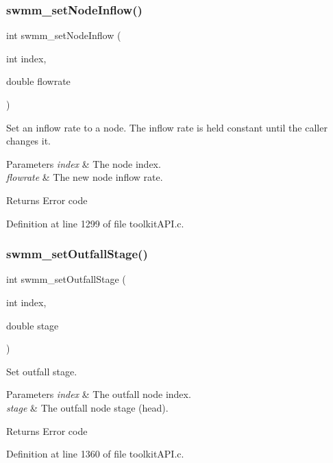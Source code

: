 \subsubsection{\texorpdfstring{swmm\+\_\+set\+Node\+Inflow()}{swmm\_setNodeInflow()}}
{\footnotesize\ttfamily int swmm\+\_\+set\+Node\+Inflow (\begin{DoxyParamCaption}\item[{int}]{index,  }\item[{double}]{flowrate }\end{DoxyParamCaption})}



Set an inflow rate to a node. The inflow rate is held constant until the caller changes it. 


\begin{DoxyParams}{Parameters}
{\em index} & The node index. \\
\hline
{\em flowrate} & The new node inflow rate. \\
\hline
\end{DoxyParams}
\begin{DoxyReturn}{Returns}
Error code 
\end{DoxyReturn}


Definition at line 1299 of file toolkit\+A\+P\+I.\+c.

\mbox{\label{group__tkfuncs_ga80d902400625073d8ff2c392365fde9b}} 
\subsubsection{\texorpdfstring{swmm\+\_\+set\+Outfall\+Stage()}{swmm\_setOutfallStage()}}
{\footnotesize\ttfamily int swmm\+\_\+set\+Outfall\+Stage (\begin{DoxyParamCaption}\item[{int}]{index,  }\item[{double}]{stage }\end{DoxyParamCaption})}



Set outfall stage. 


\begin{DoxyParams}{Parameters}
{\em index} & The outfall node index. \\
\hline
{\em stage} & The outfall node stage (head). \\
\hline
\end{DoxyParams}
\begin{DoxyReturn}{Returns}
Error code 
\end{DoxyReturn}


Definition at line 1360 of file toolkit\+A\+P\+I.\+c.

